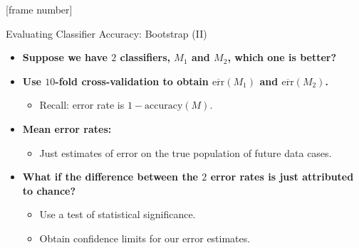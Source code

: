 \documentclass[aspectratio=169,t,table]{beamer}
\begin{document}
  {
    [frame number]
    \begin{frame}{Evaluating Classifier Accuracy: Bootstrap (II)}
      \begin{itemize}
        \item \textbf{Suppose we have $2$ classifiers, $M_1$ and $M_2$, which one is better?}
        \item \textbf{Use $10$-fold cross-validation to obtain $\overline{\text{err}}(M_1)$ and $\overline{\text{err}}(M_2)$.}
        \begin{itemize}
          \item Recall: error rate is $1-\text{accuracy}(M)$.
        \end{itemize}
        \item \textbf{Mean error rates:}
        \begin{itemize}
          \item Just estimates of error on the true population of future data cases.
        \end{itemize}
        \item \textbf{What if the difference between the $2$ error rates is just attributed to chance?}
        \begin{itemize}
          \item Use a test of statistical significance.
          \item Obtain confidence limits for our error estimates.
        \end{itemize}
      \end{itemize}
    \end{frame}
  }
\end{document}
